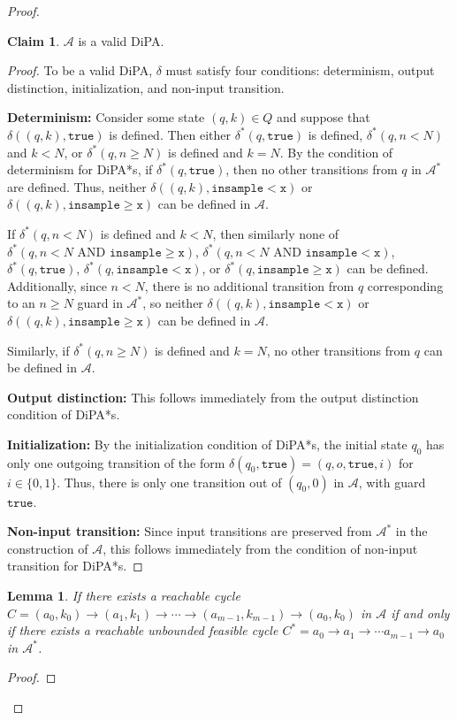 \documentclass[12pt]{article}
\newcommand{\gguard}{\texttt{insample}\geq \texttt{x}}
\newcommand{\lguard}{\texttt{insample} < \texttt{x}}
\newcommand{\gaguard}{n<N \text{ AND } \texttt{insample} \geq \texttt{x}}
\newcommand{\laguard}{n<N\text{ AND }\texttt{insample} < \texttt{x}}
\newtheorem{lemma}[thm]{Lemma}
\theoremstyle{definition}
\newtheorem{clm}[thm]{Claim}
\begin{document}
\begin{proof}
\begin{clm}
	$\mathcal{A}$ is a valid DiPA.\@
\end{clm}
\begin{proof}
	To be a valid DiPA, $\delta$ must satisfy four conditions: determinism, output distinction, initialization, and non-input transition. 

	\textbf{Determinism:} Consider some state $(q, k)\in Q$ and suppose that $\delta((q, k), \texttt{true})$ is defined. Then either $\delta^*(q, \texttt{true})$ is defined, $\delta^*(q, n <N)$ and $k < N$, or $\delta^*(q, n\geq N)$ is defined and $k = N$. By the condition of determinism for DiPA*s, if $\delta^*(q, \texttt{true})$, then no other transitions from $q$ in $\mathcal{A}^*$ are defined. Thus, neither $\delta((q, k), \lguard)$ or $\delta((q, k), \gguard)$ can be defined in $\mathcal{A}$.

	If $\delta^*(q, n < N)$ is defined and $k < N$, then similarly none of $\delta^*(q, \gaguard)$, $\delta^*(q, \laguard)$, $\delta^*(q, \texttt{true})$, $\delta^*(q, \lguard)$, or $\delta^*(q, \gguard)$ can be defined. Additionally, since $ n < N$, there is no additional transition from $q$ corresponding to an $n\geq N$ guard in $\mathcal{A}^*$, so neither $\delta((q, k), \lguard)$ or $\delta((q, k), \gguard)$ can be defined in $\mathcal{A}$.

	Similarly, if $\delta^*(q, n \geq N)$ is defined and $k = N$, no other transitions from $q$ can be defined in $\mathcal{A}$.

	\textbf{Output distinction:} This follows immediately from the output distinction condition of DiPA*s.

	\textbf{Initialization:} By the initialization condition of DiPA*s, the initial state $q_0$ has only one outgoing transition of the form $\delta(q_0, \texttt{true}) = (q, o, \texttt{true}, i)$ for $i\in \{0, 1\}$. Thus, there is only one transition out of $(q_0, 0)$ in $\mathcal{A}$, with guard $\texttt{true}$.

	\textbf{Non-input transition:} Since input transitions are preserved from $\mathcal{A}^*$ in the construction of $\mathcal{A}$, this follows immediately from the condition of non-input transition for DiPA*s.
\end{proof}


\begin{lemma}\label{cyclelemma}
	If there exists a reachable cycle $C = (a_0, k_0)\to (a_1, k_1)\to \cdots \to (a_{m-1}, k_{m-1})\to (a_0, k_0)$ in $\mathcal{A}$ if and only if there exists a reachable unbounded feasible cycle $C^* = a_0\to a_1\to \cdots a_{m-1}\to a_0$ in $\mathcal{A}^*$.
\end{lemma}
\begin{proof}


\end{proof}
\end{proof}
\end{document}

